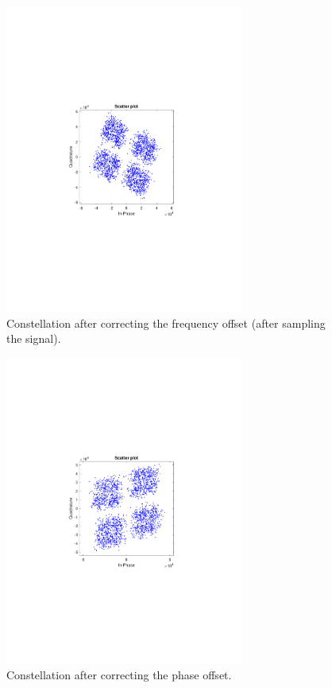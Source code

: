 \begin{figure}[H]
	\centering
	\includegraphics[clip, trim=4cm 8cm 4cm 8cm, width=0.7\textwidth]{./sdf/m_qam_system/figures/exp/const-wvCorr-sps.pdf}
	\caption{Constellation after correcting the frequency offset (after sampling the signal).}
	\label{fig:rxWvCorrSamp}
\end{figure}

\begin{figure}[H]
	\centering
	\includegraphics[clip, trim=4cm 8cm 4cm 8cm, width=0.7\textwidth]{./sdf/m_qam_system/figures/exp/const-final-sps.pdf}
	\caption{Constellation after correcting the phase offset.}
	\label{fig:rxFinal}
\end{figure}

